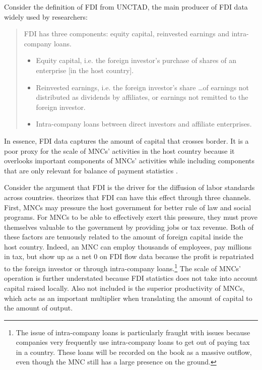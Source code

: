 Consider the definition of FDI from UNCTAD, the main producer of FDI data widely
used by researchers:

\begin{quote} FDI has three components: equity capital, reinvested earnings and
  intra-company loans.
  \begin{itemize}
  \item Equity capital, i.e. the foreign investor’s purchase of shares of an
    enterprise [in the host country].
  \item Reinvested earnings, i.e. the foreign investor’s share \ldots of
    earnings not distributed as dividends by affiliates, or earnings not
    remitted to the foreign investor.
  \item Intra-company loans between direct investors and affiliate enterprises.
  \end{itemize} \citep[245]{UNCTAD2007}
\end{quote}

In essence, FDI data captures the amount of capital that crosses border. It is a
poor proxy for the scale of MNCs' activities in the host country because it
overlooks important components of MNCs' activities while including components
that are only relevant for balance of payment statistics
\citep{Beugelsdijk2010}.

Consider the argument that FDI is the driver for the diffusion of labor
standards across countries. \citet{Mosley2007} theorizes that FDI can have this
effect through three channels. First, MNCs may pressure the host government for
better rule of law and social programs. For MNCs to be able to effectively exert
this pressure, they must prove themselves valuable to the government by
providing jobs or tax revenue. Both of these factors are tenuously related to
the amount of foreign capital inside the host country. Indeed, an MNC can employ
thousands of employees, pay millions in tax, but show up as a net 0 on FDI flow
data because the profit is repatriated to the foreign investor or through
intra-company loans.\footnote{The issue of intra-company loans is particularly
  fraught with issues because companies very frequently use intra-company loans
  to get out of paying tax in a country. These loans will be recorded on the
  book as a massive outflow, even though the MNC still has a large presence on
  the ground.} The scale of MNCs' operation is further understated because FDI
statistics does not take into account capital raised locally. Also not included
is the superior productivity of MNCs, which acts as an important multiplier when
translating the amount of capital to the amount of output.

